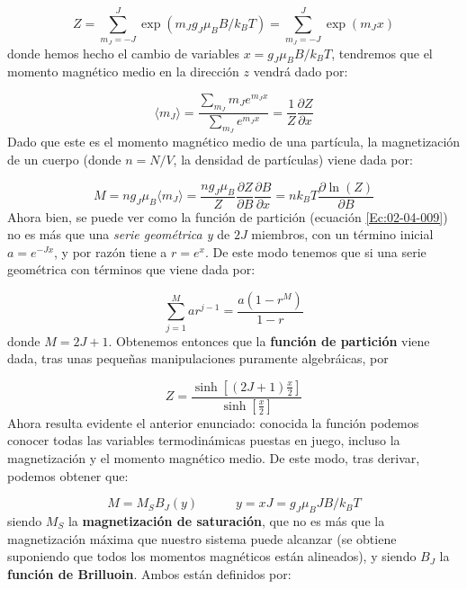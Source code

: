 \documentclass[12pt,a4paper]{book}
\numberwithin{equation}{section}
\numberwithin{figure}{section}
\newcommand{\tquad}{\quad \quad \quad}
\newcommand{\parentesis}[1]{\left( #1  \right)}
\newcommand{\parciales}[2]{\frac{\partial #1}{\partial #2}}
\newcommand{\ccorchetes}[1]{\left[ #1  \right]}
\begin{document}
\begin{equation}
Z = \sum_{m_J=-J}^{J} \exp \parentesis{m_J g_J \mu_B B / k_B T} = \sum_{m_J=-J}^{J} \exp \parentesis{m_J x}
\label{Ec:02-04-009}
\end{equation}
donde hemos hecho el cambio de variables $x=g_J \mu_B B / k_B T$, tendremos que el momento magnético medio en la dirección $z$ vendrá dado por:

\begin{equation}
\langle m_J \rangle = \frac{\sum_{m_J} m_J e^{m_J x}}{\sum_{m_J} e^{m_J x}} = \frac{1}{Z}  \parciales{Z}{x}
\end{equation}
Dado que este es el momento magnético medio de una partícula, la magnetización de un cuerpo (donde $n=N/V$, la densidad de partículas) viene dada por:

\begin{equation}
M = n g_J \mu_B \langle m_J \rangle = \frac{n g_J \mu_B}{Z} \parciales{Z}{B} \parciales{B}{x} = n k_B T \parciales{\ln (Z)}{B}
\end{equation} 
Ahora bien, se puede ver como la función de partición (ecuación \ref{Ec:02-04-009}) no es más que una \textit{serie geométrica y}  de $2J$ miembros, con un término inicial $a=e^{-Jx}$, y por razón tiene a $r = e^x$. De este modo tenemos que si una serie geométrica con términos que viene dada por:

$$ \sum_{j=1}^M a r^{j-1} = \frac{a (1-r^M)}{1-r} $$
donde $M=2J+1$. Obtenemos entonces que la \textbf{función de partición} viene dada, tras unas pequeñas manipulaciones puramente algebráicas, por

\begin{equation}
Z = \frac{\sinh \ccorchetes{(2J+1)\frac{x}{2}}}{\sinh \ccorchetes{\frac{x}{2}}}
\end{equation}
Ahora resulta evidente el anterior enunciado: conocida la función podemos conocer todas las variables termodinámicas puestas en juego, incluso la magnetización y el momento magnético medio. De este modo, tras derivar, podemos obtener que:

\begin{equation}
M = M_S B_J (y) \tquad y = x J = g_J \mu_B J B / k_B T
\end{equation}
siendo $M_S$ la \textbf{magnetización de saturación}, que no es más que la magnetización máxima que nuestro sistema puede alcanzar (se obtiene suponiendo que todos los momentos magnéticos están alineados), y siendo $B_J$ la \textbf{función de Brilluoin}. Ambos están definidos por:
\end{document}
